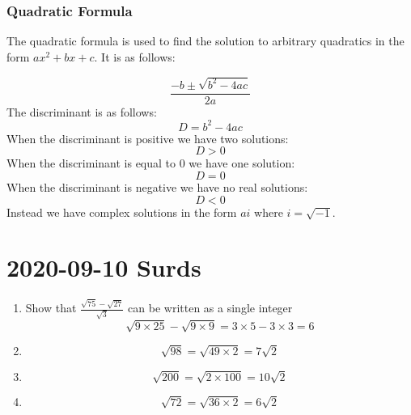 \documentclass{article}
\begin{document}
\subsubsection*{Quadratic Formula}
The quadratic formula is used to find the solution to arbitrary quadratics in the form $ax^2 + bx + c$. It is as follows:

\begin{equation}
	\frac{-b \pm \sqrt{b^2 - 4ac}}{2a}
\end{equation}
The discriminant is as follows:
\begin{equation}
	D = b^2 - 4ac
\end{equation}
When the discriminant is positive we have two solutions:
\begin{equation}
	D > 0
\end{equation}
When the discriminant is equal to $0$ we have one solution:
\begin{equation}
	D = 0
\end{equation}
When the discriminant is negative we have no real solutions:
\begin{equation}
	D < 0
\end{equation}
Instead we have complex solutions in the form $ai$ where $i = \sqrt{-1}$.

\section{2020-09-10 Surds}

\begin{enumerate}
	\item Show that $\frac{\sqrt{75} - \sqrt{27}}{\sqrt{3}}$ can be written as a single integer
		\begin{equation}
			\sqrt{9 \times 25} - \sqrt{9 \times 9} = 3 \times 5 - 3 \times 3 = 6
		\end{equation}
	\item
		\begin{equation}
			\sqrt{98} = \sqrt{49 \times 2} = 7\sqrt{2}
		\end{equation}
	\item
		\begin{equation}
			\sqrt{200} = \sqrt{2 \times 100} = 10\sqrt{2}
		\end{equation}

	\item
		\begin{equation}
			\sqrt{72} = \sqrt{36 \times 2} = 6\sqrt{2}
		\end{equation}
\end{enumerate}
\end{document}
